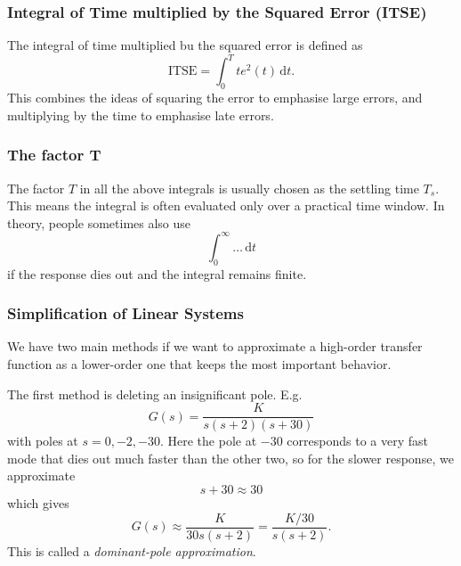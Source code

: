\subsubsection{Integral of Time multiplied by the Squared Error (ITSE)}
The integral of time multiplied bu the squared error is defined as
\begin{equation*}
  \mathrm{ITSE} = \int_{0}^{T} te^{2}(t) \, \mathrm{d}t
.\end{equation*}
This combines the ideas of squaring the error to emphasise large errors, and multiplying by the time to emphasise late errors.

\subsubsection{The factor T}
The factor $T$ in all the above integrals is usually chosen as the settling time $T_s$.
This means the integral is often evaluated only over a practical time window.
In theory, people sometimes also use
\begin{equation*}
  \int_{0}^{\infty} \ldots \, \mathrm{d}t 
\end{equation*}
if the response dies out and the integral remains finite.

\subsubsection{Simplification of Linear Systems}
We have two main methods if we want to approximate a high-order transfer function as a lower-order one that keeps the most important behavior.

The first method is deleting an insignificant pole.
E.g.
\begin{equation*}
  G(s) = \frac{K}{s(s+2)(s+30)}
\end{equation*}
with poles at $s = 0, -2, -30$.
Here the pole at $-30$ corresponds to a very fast mode that dies out much faster than the other two, so for the slower response, we approximate
\begin{equation*}
  s + 30 \approx 30
\end{equation*}
which gives
\begin{equation*}
  G(s) \approx \frac{K}{30s (s+2)} = \frac{K / 30}{s (s+2)}
.\end{equation*}
This is called a \textit{dominant-pole approximation}.

